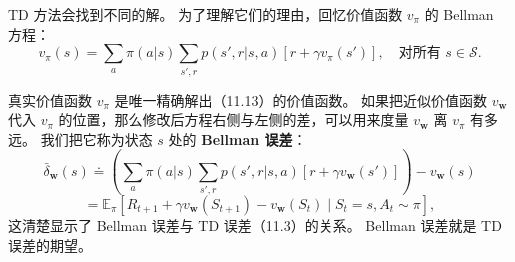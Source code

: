 \documentclass[UTF8, 12pt, fontset=fandol, oneside]{ctexart}
\begin{document}
TD 方法会找到不同的解。
为了理解它们的理由，回忆价值函数 $v_\pi$ 的 Bellman 方程：
\begin{equation}
v_\pi(s)=\sum_a\pi(a|s)\sum_{s',r}p(s',r|s,a)\left[r+\gamma v_\pi(s')\right],
\quad \text{对所有 }s\in\mathcal{S}.
\tag{11.13}
\end{equation}

\begin{center}
\end{center}

真实价值函数 $v_\pi$ 是唯一精确解出（11.13）的价值函数。
如果把近似价值函数 $v_{\mathbf{w}}$ 代入 $v_\pi$ 的位置，那么修改后方程右侧与左侧的差，可以用来度量 $v_{\mathbf{w}}$ 离 $v_\pi$ 有多远。
我们把它称为状态 $s$ 处的 \textbf{Bellman 误差}：
\begin{equation}
\bar\delta_{\mathbf{w}}(s)\doteq
\left(\sum_a\pi(a|s)\sum_{s',r}p(s',r|s,a)\left[r+\gamma v_{\mathbf{w}}(s')\right]\right)-v_{\mathbf{w}}(s)
\tag{11.17}
\end{equation}
\begin{equation}
=\mathbb{E}_\pi\left[R_{t+1}+\gamma v_{\mathbf{w}}(S_{t+1})-v_{\mathbf{w}}(S_t)\mid S_t=s,A_t\sim\pi\right],
\tag{11.18}
\end{equation}
这清楚显示了 Bellman 误差与 TD 误差（11.3）的关系。
Bellman 误差就是 TD 误差的期望。
\end{document}
